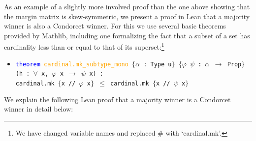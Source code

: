 \documentclass[runningheads]{llncs}
\begin{document}
As an example of a slightly more involved proof than the one above showing that the margin matrix is skew-symmetric, we present a proof in Lean that a majority winner is also a Condorcet winner. For this we use several basic theorems provided by Mathlib, including one formalizing the fact that a subset of a set has cardinality less than or equal to that of its superset:\footnote{We have changed variable names and replaced $\#$ with `cardinal.mk'.}
\begin{itemize}
\item[] \texttt{\textcolor{blue}{theorem} \textcolor{orange}{cardinal.mk\_subtype\_mono} $\{$$\alpha$ : Type u$\}$ $\{$$\varphi$ $\psi$ : $\alpha$ $\to$ Prop$\}$} \\
\texttt{(h : $\forall$ x, $\varphi$ x $\to$ $\psi$ x) :} \\
\texttt{cardinal.mk $\{$x // $\varphi$ x$\}$ $\leq$ cardinal.mk $\{$x // $\psi$ x$\}$}
\end{itemize}
We explain the following Lean proof that a majority winner is a Condorcet winner in detail below:
\end{document}
